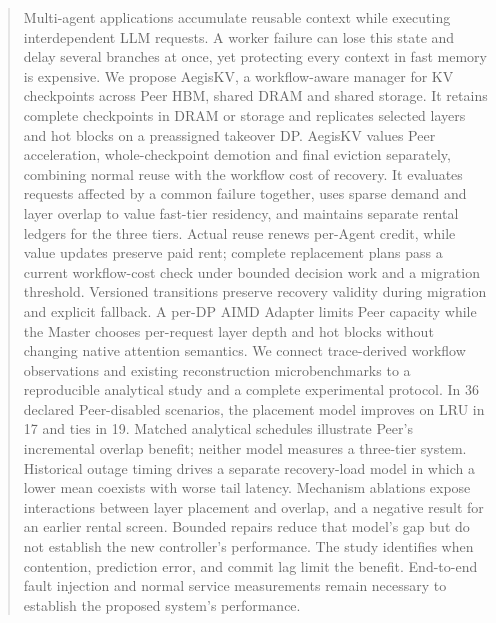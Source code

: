 \begin{abstract}
Multi-agent applications accumulate reusable context while executing
interdependent LLM requests. A worker failure can lose this state and delay
several branches at once, yet protecting every context in fast memory is
expensive. We propose AegisKV, a workflow-aware manager for KV checkpoints
across Peer HBM, shared DRAM and shared storage. It retains complete
checkpoints in DRAM or storage and replicates selected layers and hot
blocks on a preassigned takeover DP. AegisKV values Peer acceleration,
whole-checkpoint demotion and final eviction separately, combining normal reuse
with the workflow cost of recovery. It evaluates requests affected by a
common failure together, uses sparse demand and layer overlap to value
fast-tier residency, and maintains separate rental ledgers for the three
tiers. Actual reuse renews per-Agent credit, while value updates preserve
paid rent; complete replacement plans pass a current workflow-cost check
under bounded decision work and a migration threshold.
Versioned transitions preserve recovery validity during migration and
explicit fallback. A per-DP AIMD Adapter limits Peer capacity while the Master
chooses per-request layer depth and hot blocks without changing native
attention semantics. We connect trace-derived
workflow observations and existing reconstruction microbenchmarks to a
reproducible analytical study and a complete experimental protocol.
In 36 declared Peer-disabled scenarios, the placement model improves on
LRU in 17 and ties in 19. Matched analytical schedules illustrate Peer's
incremental overlap benefit; neither model measures a three-tier system. Historical outage timing drives a separate recovery-load model in which
a lower mean coexists with worse tail latency. Mechanism ablations expose
interactions between layer placement and overlap, and a negative result
for an earlier rental screen. Bounded repairs reduce that model's gap
but do not establish the new controller's performance. The study
identifies when contention, prediction error, and commit
lag limit the benefit. End-to-end fault injection and normal
service measurements remain necessary to establish the proposed system's
performance.
\end{abstract}

